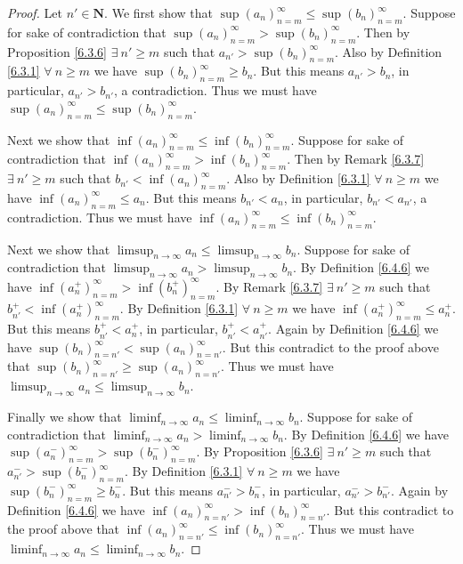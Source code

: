 \begin{proof}
    Let \(n' \in \mathbf{N}\).
    We first show that \(\sup(a_n)_{n = m}^\infty \leq \sup(b_n)_{n = m}^\infty\).
    Suppose for sake of contradiction that \(\sup(a_n)_{n = m}^\infty > \sup(b_n)_{n = m}^\infty\).
    Then by Proposition \ref{6.3.6} \(\exists\ n' \geq m\) such that \(a_{n'} > \sup(b_n)_{n = m}^\infty\).
    Also by Definition \ref{6.3.1} \(\forall\ n \geq m\) we have \(\sup(b_n)_{n = m}^\infty \geq b_n\).
    But this means \(a_{n'} > b_n\), in particular, \(a_{n'} > b_{n'}\), a contradiction.
    Thus we must have \(\sup(a_n)_{n = m}^\infty \leq \sup(b_n)_{n = m}^\infty\).

    Next we show that \(\inf(a_n)_{n = m}^\infty \leq \inf(b_n)_{n = m}^\infty\).
    Suppose for sake of contradiction that \(\inf(a_n)_{n = m}^\infty > \inf(b_n)_{n = m}^\infty\).
    Then by Remark \ref{6.3.7} \(\exists\ n' \geq m\) such that \(b_{n'} < \inf(a_n)_{n = m}^\infty\).
    Also by Definition \ref{6.3.1} \(\forall\ n \geq m\) we have \(\inf(a_n)_{n = m}^\infty \leq a_n\).
    But this means \(b_{n'} < a_n\), in particular, \(b_{n'} < a_{n'}\), a contradiction.
    Thus we must have \(\inf(a_n)_{n = m}^\infty \leq \inf(b_n)_{n = m}^\infty\).

    Next we show that \(\limsup_{n \to \infty} a_n \leq \limsup_{n \to \infty} b_n\).
    Suppose for sake of contradiction that \(\limsup_{n \to \infty} a_n > \limsup_{n \to \infty} b_n\).
    By Definition \ref{6.4.6} we have \(\inf(a_n^+)_{n = m}^\infty > \inf(b_n^+)_{n = m}^\infty\).
    By Remark \ref{6.3.7} \(\exists\ n' \geq m\) such that \(b_{n'}^+ < \inf(a_n^+)_{n = m}^\infty\).
    By Definition \ref{6.3.1} \(\forall\ n \geq m\) we have \(\inf(a_n^+)_{n = m}^\infty \leq a_n^+\).
    But this means \(b_{n'}^+ < a_n^+\), in particular, \(b_{n'}^+ < a_{n'}^+\).
    Again by Definition \ref{6.4.6} we have \(\sup(b_n)_{n = n'}^\infty < \sup(a_n)_{n = n'}^\infty\).
    But this contradict to the proof above that \(\sup(b_n)_{n = n'}^\infty \geq \sup(a_n)_{n = n'}^\infty\).
    Thus we must have \(\limsup_{n \to \infty} a_n \leq \limsup_{n \to \infty} b_n\).

    Finally we show that \(\liminf_{n \to \infty} a_n \leq \liminf_{n \to \infty} b_n\).
    Suppose for sake of contradiction that \(\liminf_{n \to \infty} a_n > \liminf_{n \to \infty} b_n\).
    By Definition \ref{6.4.6} we have \(\sup(a_n^-)_{n = m}^\infty > \sup(b_n^-)_{n = m}^\infty\).
    By Proposition \ref{6.3.6} \(\exists\ n' \geq m\) such that \(a_{n'}^- > \sup(b_n^-)_{n = m}^\infty\).
    By Definition \ref{6.3.1} \(\forall\ n \geq m\) we have \(\sup(b_n^-)_{n = m}^\infty \geq b_n^-\).
    But this means \(a_{n'}^- > b_n^-\), in particular, \(a_{n'}^- > b_{n'}^-\).
    Again by Definition \ref{6.4.6} we have \(\inf(a_n)_{n = n'}^\infty > \inf(b_n)_{n = n'}^\infty\).
    But this contradict to the proof above that \(\inf(a_n)_{n = n'}^\infty \leq \inf(b_n)_{n = n'}^\infty\).
    Thus we must have \(\liminf_{n \to \infty} a_n \leq \liminf_{n \to \infty} b_n\).
\end{proof}

